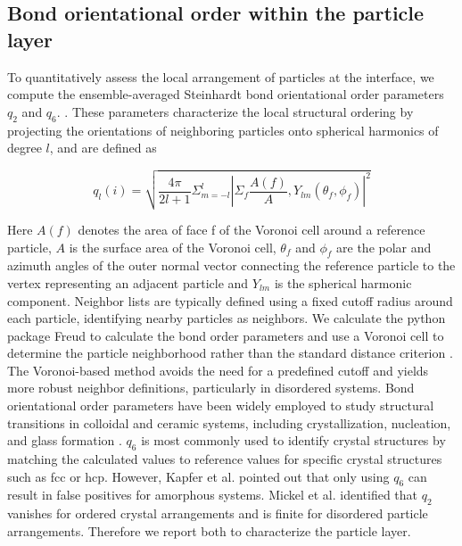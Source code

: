 \subsection{Bond orientational order within the particle layer}

To quantitatively assess the local arrangement of particles at the interface, we compute the ensemble-averaged Steinhardt bond orientational order parameters $q_2$ and $q_6$.
\cite{steinhardt_bond-orientational_1983, lechner_accurate_2008, mickel_shortcomings_2013}. These parameters characterize the local structural ordering by projecting the orientations of neighboring particles 
onto spherical harmonics of degree \(l\), and are defined as


\begin{equation}
q_l(i) = \sqrt{ \frac{4 \pi}{2l + 1} \Sigma_{m = -l}^{l} | \Sigma_{f} \frac{A(f)}{A}, Y_{lm}(\theta_f, \phi_f) |^2 }
\label{eq:steinhardt_definition}
\end{equation} 

Here $A(f)$ denotes the area of face f of the Voronoi cell around a reference particle, $A$ is the surface area of the Voronoi cell, 
$\theta_f$ and $\phi_f$ are the polar and azimuth angles of the outer normal vector connecting the reference particle to the vertex representing
an adjacent particle and $Y_{lm}$ is the spherical harmonic component. 
Neighbor lists are typically defined using a fixed cutoff radius around each particle, identifying nearby particles as neighbors. 
We calculate the python package Freud to calculate the bond order parameters and use a Voronoi cell to determine the particle neighborhood rather than the standard distance criterion 
\cite{ramasubramani_freud_2020,mickel_shortcomings_2013}. The Voronoi-based method avoids the need for a predefined cutoff and yields more robust neighbor definitions, particularly in disordered systems. 
Bond orientational order parameters have been widely employed to study structural transitions in colloidal and ceramic systems, including crystallization, nucleation, and glass formation 
\cite{vagberg_glassiness_2011, besseling_three-dimensional_2007, schall_structural_2007, ozawa_jamming_2012}. $q_6$ is most commonly used to identify crystal structures by matching the calculated
values to reference values for specific crystal structures such as fcc or hcp. However, Kapfer et al. pointed out that only using $q_6$ can result in false positives for amorphous systems. \cite{kapfer_jammed_2012}
Mickel et al. identified that $q_2$ vanishes for ordered crystal arrangements and is finite for disordered particle arrangements. \cite{mickel_shortcomings_2013} Therefore we report both to
characterize the particle layer. 

